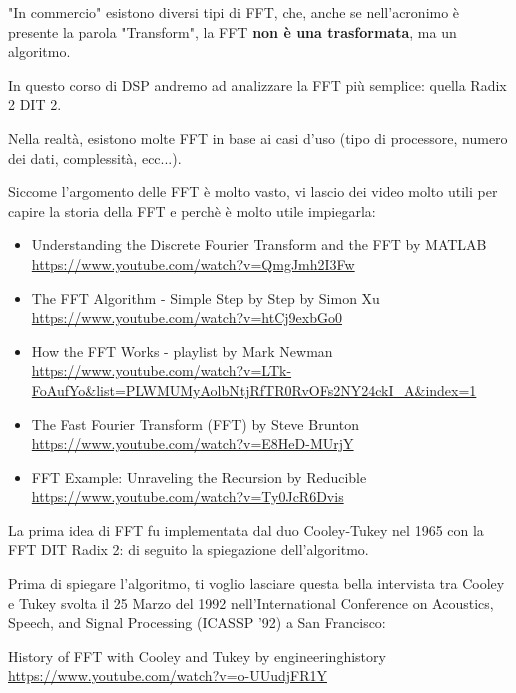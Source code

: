 \begin{tcolorbox}
    "In commercio" esistono diversi tipi di FFT, che, anche se nell'acronimo è presente la parola "Transform", la FFT \textbf{non è una trasformata}, 
    ma un algoritmo. \newline 

    In questo corso di DSP andremo ad analizzare la FFT più semplice: quella Radix 2 DIT 2. \newline 

    Nella realtà, esistono molte FFT in base ai casi d'uso (tipo di processore, numero dei dati, complessità, ecc...). \newline 

    Siccome l'argomento delle FFT è molto vasto, vi lascio dei video molto utili per capire la storia della FFT e perchè è molto utile impiegarla: 

    \begin{itemize}
        \item Understanding the Discrete Fourier Transform and the FFT by MATLAB \\\url{https://www.youtube.com/watch?v=QmgJmh2I3Fw}
        \item The FFT Algorithm - Simple Step by Step by Simon Xu \\\url{https://www.youtube.com/watch?v=htCj9exbGo0}
        \item How the FFT Works - playlist by Mark Newman \\\url{https://www.youtube.com/watch?v=LTk-FoAufYo&list=PLWMUMyAolbNtjRfTR0RvOFs2NY24ckI_A&index=1}
        \item The Fast Fourier Transform (FFT) by Steve Brunton \\\url{https://www.youtube.com/watch?v=E8HeD-MUrjY} 
        \item FFT Example: Unraveling the Recursion by Reducible\\\url{https://www.youtube.com/watch?v=Ty0JcR6Dvis}
    \end{itemize}
    
\end{tcolorbox}

La prima idea di FFT fu implementata dal duo Cooley-Tukey nel 1965 con la FFT DIT Radix 2: di seguito la spiegazione dell'algoritmo. \newline 

\begin{tcolorbox}
    Prima di spiegare l'algoritmo, ti voglio lasciare questa bella intervista tra Cooley e Tukey svolta il 25 Marzo del 1992 nell'International Conference on Acoustics, Speech, and Signal Processing (ICASSP '92) a San Francisco: \newline 

    History of FFT with Cooley and Tukey by engineeringhistory \\
    \url{https://www.youtube.com/watch?v=o-UUudjFR1Y}
\end{tcolorbox}

